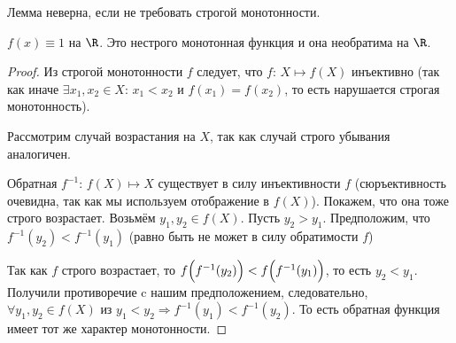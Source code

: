 \begin{note}
    Лемма неверна, если не требовать строгой монотонности.
\end{note}
\begin{example}
    $ f(x) \equiv 1 $ на $\R$. Это нестрого монотонная функция и она необратима на $\R$.
\end{example}
\begin{proof}
    Из строгой монотонности $f$ следует, что $f$: $X \mapsto f (X)$ инъективно (так как иначе $\exists x_{1}, x_{2} \in X$: $x_{1} < x_{2}$ и $f (x_{1}) = f (x_{2})$, то есть нарушается строгая монотонность).

    Рассмотрим случай возрастания на $X$, так как случай строго убывания аналогичен.

    Обратная $f^{-1}$: $f(X) \mapsto X$ существует в силу инъективности $f$ (сюръективность очевидна, так как мы используем отображение в $f (X)$). Покажем, что она тоже строго возрастает. Возьмём $y_{1}, y_{2} \in f(X)$. Пусть $y_{2} > y_{1}$. Предположим, что $f^{-1} (y_{2}) < f^{-1}(y_{1})$ (равно быть не может в силу обратимости $f$)

    Так как $f$ строго возрастает, то $f\Bigl(f^{-1}(y_{2})\Bigr) < f\Bigl(f^{-1}(y_{1})\Bigr)$, то есть $y_{2} < y_{1}$. Получили противоречие c нашим предположением, следовательно, $\forall y_{1}, y_{2} \in f(X)$ из $y_{1} < y_{2} \Rightarrow f^{-1}(y_{1}) < f^{-1}(y_{2}).$ То есть обратная функция имеет тот же характер монотонности.
\end{proof}

